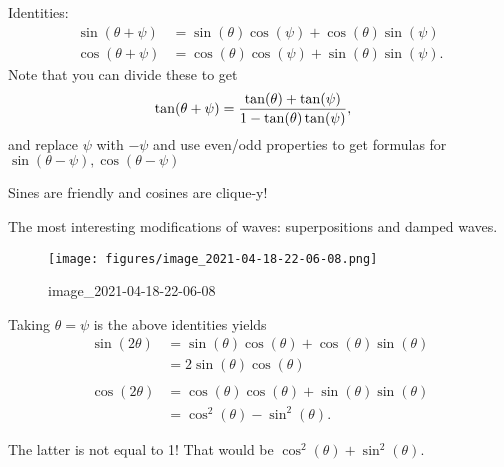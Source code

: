 \begin{proposition}[?]

Identities:
\begin{align*}
\sin(\theta + \psi) &= \sin(\theta) \cos(\psi) + \cos(\theta) \sin(\psi) \\
\cos(\theta + \psi) &= \cos(\theta) \cos(\psi) + \sin(\theta) \sin(\psi)
.\end{align*}
Note that you can divide these to get
\begin{align*}
\tan(\theta + \psi) &= {\tan(\theta) + \tan(\psi) \over 1 - \tan(\theta) \tan(\psi) }
,\end{align*}
and replace \(\psi\) with \(-\psi\) and use even/odd properties to get
formulas for \(\sin(\theta - \psi), \cos(\theta - \psi)\)

\end{proposition}

\begin{slogan}

Sines are friendly and cosines are clique-y!

\end{slogan}

\begin{remark}

The most interesting modifications of waves: superpositions and damped
waves.

\begin{figure}
\centering
\texttt{[image: figures/image\_2021-04-18-22-06-08.png]}
\caption{image\_2021-04-18-22-06-08}
\end{figure}

\end{remark}

\begin{corollary}

Taking \(\theta = \psi\) is the above identities yields
\begin{align*}
\sin(2\theta ) 
&= \sin(\theta) \cos(\theta) + \cos(\theta) \sin(\theta) \\
&= 2\sin(\theta)\cos(\theta) \\ \\
\cos(2\theta) 
&= \cos(\theta) \cos(\theta) + \sin(\theta) \sin(\theta) \\
&= \cos^2(\theta) - \sin^2(\theta) 
.\end{align*}

\end{corollary}

\begin{warnings}

The latter is not equal to 1! That would be
\(\cos^2(\theta) + \sin^2(\theta)\).

\end{warnings}

